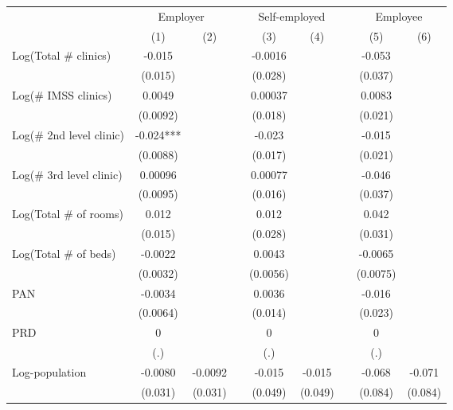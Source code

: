 \begin{tabular}{lcccccccc}
\toprule
      & \multicolumn{2}{c}{Employer} &       & \multicolumn{2}{c}{Self-employed} &       & \multicolumn{2}{c}{Employee} \\
\cmidrule{2-3}\cmidrule{5-6}\cmidrule{8-9}      & (1)   & (2)   &       & (3)   & (4)   &       & (5)   & (6) \\
\midrule
\midrule
Log(Total \# clinics) & -0.015 &       &       & -0.0016 &       &       & -0.053 &  \\
      & (0.015) &       &       & (0.028) &       &       & (0.037) &  \\
Log(\# IMSS clinics) & 0.0049 &       &       & 0.00037 &       &       & 0.0083 &  \\
      & (0.0092) &       &       & (0.018) &       &       & (0.021) &  \\
Log(\# 2nd level clinic) & -0.024*** &       &       & -0.023 &       &       & -0.015 &  \\
      & (0.0088) &       &       & (0.017) &       &       & (0.021) &  \\
Log(\# 3rd level clinic) & 0.00096 &       &       & 0.00077 &       &       & -0.046 &  \\
      & (0.0095) &       &       & (0.016) &       &       & (0.037) &  \\
Log(Total \# of rooms) & 0.012 &       &       & 0.012 &       &       & 0.042 &  \\
      & (0.015) &       &       & (0.028) &       &       & (0.031) &  \\
Log(Total \# of beds) & -0.0022 &       &       & 0.0043 &       &       & -0.0065 &  \\
      & (0.0032) &       &       & (0.0056) &       &       & (0.0075) &  \\
PAN   & -0.0034 &       &       & 0.0036 &       &       & -0.016 &  \\
      & (0.0064) &       &       & (0.014) &       &       & (0.023) &  \\
PRD   & 0     &       &       & 0     &       &       & 0     &  \\
      & (.)   &       &       & (.)   &       &       & (.)   &  \\
\midrule
Log-population & -0.0080 & -0.0092 &       & -0.015 & -0.015 &       & -0.068 & -0.071 \\
      & (0.031) & (0.031) &       & (0.049) & (0.049) &       & (0.084) & (0.084) \\

\end{tabular}
